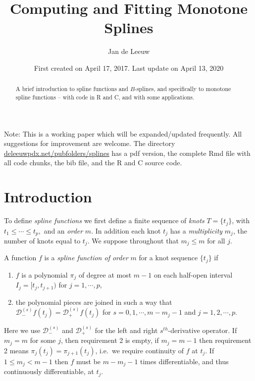 \documentclass[
  12pt,
]{article}
\title{Computing and Fitting Monotone Splines}
\author{Jan de Leeuw}
\date{First created on April 17, 2017. Last update on April 13, 2020}
\providecommand{\tightlist}{%
  \setlength{\itemsep}{0pt}\setlength{\parskip}{0pt}}
\begin{document}
\maketitle
\begin{abstract}
A brief introduction to spline functions and \(B\)-splines, and
specifically to monotone spline functions -- with code in R and C, and
with some applications.
\end{abstract}

{
\setcounter{tocdepth}{3}
\tableofcontents
}
Note: This is a working paper which will be expanded/updated frequently.
All suggestions for improvement are welcome. The directory
\href{http://deleeuwpdx.net/pubfolders/splines}{deleeuwpdx.net/pubfolders/splines}
has a pdf version, the complete Rmd file with all code chunks, the bib
file, and the R and C source code.

\hypertarget{introduction}{%
\section{Introduction}\label{introduction}}

To define \emph{spline functions} we first define a finite sequence of
\emph{knots} \(T=\{t_j\}\), with \(t_1\leq\cdots\leq t_p,\) and an
\emph{order} \(m\). In addition each knot \(t_j\) has a
\emph{multiplicity} \(m_j\), the number of knots equal to \(t_j\). We
suppose throughout that \(m_j\leq m\) for all \(j\).

A function \(f\) is a \emph{spline function of order} \(m\) for a knot
sequence \(\{t_j\}\) if

\begin{enumerate}
\def\labelenumi{\arabic{enumi}.}
\tightlist
\item
  \(f\) is a polynomial \(\pi_j\) of degree at most \(m-1\) on each
  half-open interval \(I_j=[t_j,t_{j+1})\) for \(j=1,\cdots,p\),
\item
  the polynomial pieces are joined in such a way that
  \(\mathcal{D}^{(s)}_-f(t_j)=\mathcal{D}^{(s)}_+f(t_j)\) for
  \(s=0,1,\cdots,m-m_j-1\) and \(j=1,2,\cdots,p\).
\end{enumerate}

Here we use \(\mathcal{D}^{(s)}_-\) and \(\mathcal{D}^{(s)}_+\) for the
left and right \(s^{th}\)-derivative operator. If \(m_j=m\) for some
\(j\), then requirement 2 is empty, if \(m_j=m-1\) then requirement 2
means \(\pi_j(t_j)=\pi_{j+1}(t_j)\), i.e.~we require continuity of \(f\)
at \(t_j\). If \(1\leq m_j<m-1\) then \(f\) must be \(m-m_j-1\) times
differentiable, and thus continuously differentiable, at \(t_j\).
\end{document}
